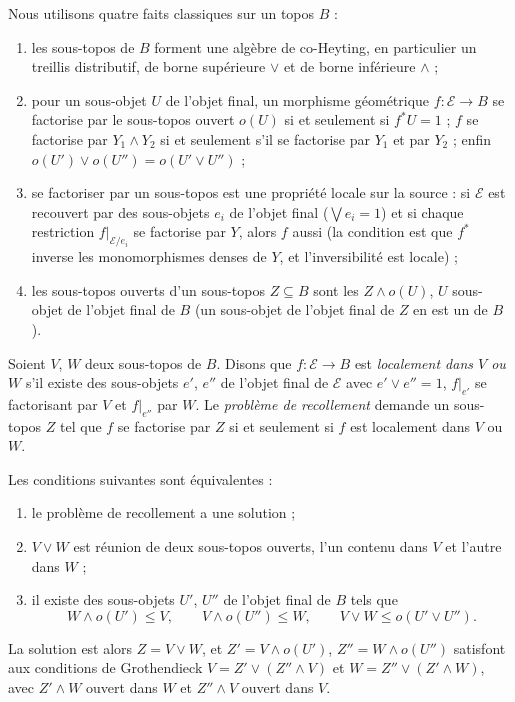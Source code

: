 Nous utilisons quatre faits classiques sur un topos $B$ \cite[\S A4.5]{elephant} :
\begin{enumerate}
\item[(F1)] les sous-topos de $B$ forment une algèbre de co-Heyting, en particulier un treillis distributif, de borne supérieure $\vee$ et de borne inférieure $\wedge$ ;
\item[(F2)] pour un sous-objet $U$ de l'objet final, un morphisme géométrique $f\colon \mathcal E\to B$ se factorise par le sous-topos ouvert $o(U)$ si et seulement si $f^*U = 1$ ; $f$ se factorise par $Y_1\wedge Y_2$ si et seulement s'il se factorise par $Y_1$ et par $Y_2$ ; enfin $o(U')\vee o(U'') = o(U'\vee U'')$ ;
\item[(F3)] se factoriser par un sous-topos est une propriété locale sur la source : si $\mathcal E$ est recouvert par des sous-objets $e_i$ de l'objet final ($\bigvee e_i = 1$) et si chaque restriction $f|_{\mathcal E/e_i}$ se factorise par $Y$, alors $f$ aussi (la condition est que $f^*$ inverse les monomorphismes denses de $Y$, et l'inversibilité est locale) ;
\item[(F4)] les sous-topos ouverts d'un sous-topos $Z\subseteq B$ sont les $Z\wedge o(U)$, $U$ sous-objet de l'objet final de $B$ (un sous-objet de l'objet final de $Z$ en est un de $B$).
\end{enumerate}
Soient $V$, $W$ deux sous-topos de $B$. Disons que $f\colon\mathcal E\to B$ est \emph{localement dans $V$ ou $W$} s'il existe des sous-objets $e'$, $e''$ de l'objet final de $\mathcal E$ avec $e'\vee e'' = 1$, $f|_{e'}$ se factorisant par $V$ et $f|_{e''}$ par $W$. Le \emph{problème de recollement} demande un sous-topos $Z$ tel que $f$ se factorise par $Z$ si et seulement si $f$ est localement dans $V$ ou $W$.

\begin{theorem}\label{th:gluing}
Les conditions suivantes sont équivalentes :
\begin{enumerate}
\item le problème de recollement a une solution ;
\item $V\vee W$ est réunion de deux sous-topos ouverts, l'un contenu dans $V$ et l'autre dans $W$ ;
\item il existe des sous-objets $U'$, $U''$ de l'objet final de $B$ tels que
\[
W\wedge o(U')\le V,\qquad V\wedge o(U'')\le W,\qquad V\vee W\le o(U'\vee U'').
\]
\end{enumerate}
La solution est alors $Z = V\vee W$, et $Z' = V\wedge o(U')$, $Z'' = W\wedge o(U'')$ satisfont aux conditions de Grothendieck $V = Z'\vee(Z''\wedge V)$ et $W = Z''\vee(Z'\wedge W)$, avec $Z'\wedge W$ ouvert dans $W$ et $Z''\wedge V$ ouvert dans $V$.
\end{theorem}

